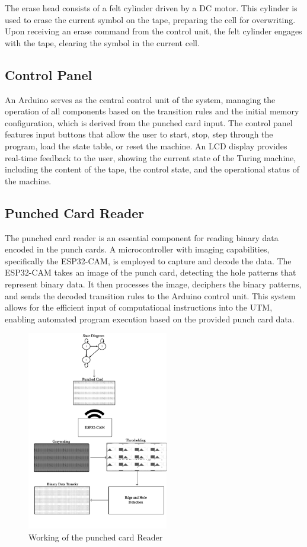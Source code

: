 The erase head consists of a felt cylinder driven by a DC motor. This cylinder is used to erase the current symbol on the tape, preparing the cell for overwriting. Upon receiving an erase command from the control unit, the felt cylinder engages with the tape, clearing the symbol in the current cell.

\subsection{Control Panel}

An Arduino serves as the central control unit of the system, managing the operation of all components based on the transition rules and the initial memory configuration, which is derived from the punched card input. The control panel features input buttons that allow the user to start, stop, step through the program, load the state table, or reset the machine. An LCD display provides real-time feedback to the user, showing the current state of the Turing machine, including the content of the tape, the control state, and the operational status of the machine.

\subsection{Punched Card Reader}

The punched card reader is an essential component for reading binary data encoded in the punch cards. A microcontroller with imaging capabilities, specifically the ESP32-CAM, is employed to capture and decode the data. The ESP32-CAM takes an image of the punch card, detecting the hole patterns that represent binary data. It then processes the image, deciphers the binary patterns, and sends the decoded transition rules to the Arduino control unit. This system allows for the efficient input of computational instructions into the UTM, enabling automated program execution based on the provided punch card data.

\begin{figure}[h!]
    \centering
    \includegraphics[width=0.55\textwidth]{content/images/punchedCardReader.png}
    \caption{Working of the punched card Reader}
        \label{fig:punchedCardReader}
\end{figure}

